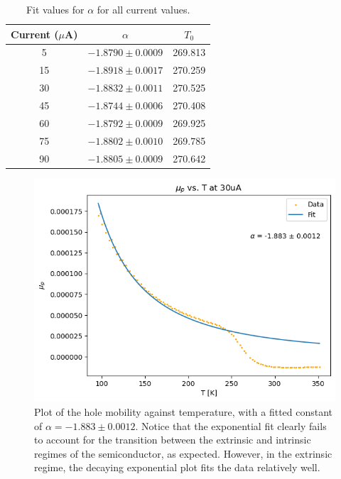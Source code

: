 \documentclass[10pt]{article}
\begin{document}
	\begin{table}
		\centering
		\def\arraystretch{1.75}
		\begin{tabular}{|c|c|c|}
			\hline
			\textbf{Current ($\mu$A)} & \textbf{$\alpha$} & \textbf{$T_0$} \\ \hline
			5                         & $-1.8790 \pm 0.0009$                   & 269.813        \\ \hline
			15                        & $-1.8918 \pm 0.0017$                   & 270.259        \\ \hline
			30                        & $-1.8832 \pm 0.0011$                   & 270.525        \\ \hline
			45                        & $-1.8744 \pm 0.0006$                   & 270.408        \\ \hline
			60                        & $-1.8792 \pm 0.0009$                   & 269.925        \\ \hline
			75                        & $-1.8802 \pm 0.0010$                   & 269.785        \\ \hline
			90                        & $-1.8805 \pm 0.0009$                   & 270.642        \\ \hline
		\end{tabular}
		\caption{Fit values for \( \alpha \) for all current values.}
		\label{alpha-fit}
	\end{table}

	\begin{figure}
		\centering
		\includegraphics[scale=0.7]{images/30uA-mu-plot.png}
		\caption{Plot of the hole mobility against temperature, with a fitted constant of \( \alpha = -1.883
			\pm 0.0012 \). Notice that the exponential fit clearly fails
			to account for the transition between the extrinsic and intrinsic regimes of the semiconductor,
			as expected. However, in the extrinsic regime, the decaying exponential plot fits the data
		relatively well.}   
		\label{mu-vs-T}
	\end{figure}
\end{document}
